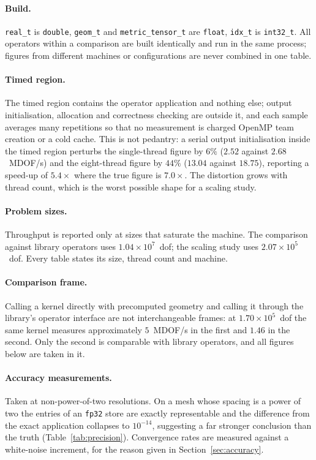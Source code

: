 \documentclass[11pt]{article}
\begin{document}
\paragraph{Build.}  \texttt{real\_t} is \texttt{double}, \texttt{geom\_t} and
\texttt{metric\_tensor\_t} are \texttt{float}, \texttt{idx\_t} is
\texttt{int32\_t}.  All operators within a comparison are built identically and
run in the same process; figures from different machines or configurations are
never combined in one table.

\paragraph{Timed region.}  The timed region contains the operator application and
nothing else; output initialisation, allocation and correctness checking are
outside it, and each sample averages many repetitions so that no measurement is
charged OpenMP team creation or a cold cache.  This is not pedantry: a serial
output initialisation inside the timed region perturbs the single-thread figure
by $6\%$ ($2.52$ against $2.68$~MDOF/s) and the eight-thread figure by $44\%$
($13.04$ against $18.75$), reporting a speed-up of $5.4\times$ where the true
figure is $7.0\times$.  The distortion grows with thread count, which is the
worst possible shape for a scaling study.

\paragraph{Problem sizes.}  Throughput is reported only at sizes that saturate the
machine.  The comparison against library operators uses
$1.04\times10^{7}$~dof; the scaling study uses $2.07\times10^{5}$~dof.  Every
table states its size, thread count and machine.

\paragraph{Comparison frame.}  Calling a kernel directly with precomputed geometry
and calling it through the library's operator interface are not interchangeable
frames: at $1.70\times10^{5}$~dof the same kernel measures approximately
$5$~MDOF/s in the first and $1.46$ in the second.  Only the second is comparable
with library operators, and all figures below are taken in it.

\paragraph{Accuracy measurements.}  Taken at non-power-of-two resolutions.  On a
mesh whose spacing is a power of two the entries of an \texttt{fp32} store are
exactly representable and the difference from the exact application collapses to
$10^{-14}$, suggesting a far stronger conclusion than the truth
(Table~\ref{tab:precision}).  Convergence rates are measured against a
white-noise increment, for the reason given in Section~\ref{sec:accuracy}.
\end{document}

